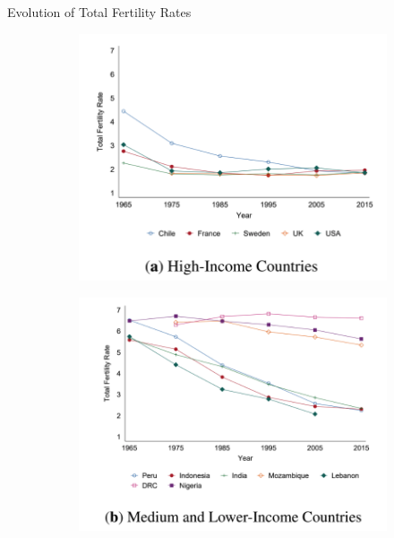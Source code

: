 \documentclass[11pt,notes=hide,aspectratio=169,mathserif]{beamer}
\begin{document}
\begin{frame}{Evolution of Total Fertility Rates}
\begin{figure}
  \centering
  \begin{subfigure}{0.48\textwidth}
    \centering
    \includegraphics[width=\linewidth]{hic.png}
  \end{subfigure}\hfill
  \begin{subfigure}{0.48\textwidth}
    \centering
    \includegraphics[width=\linewidth]{mlic.png}
  \end{subfigure}
\end{figure}
\end{frame}
\end{document}
